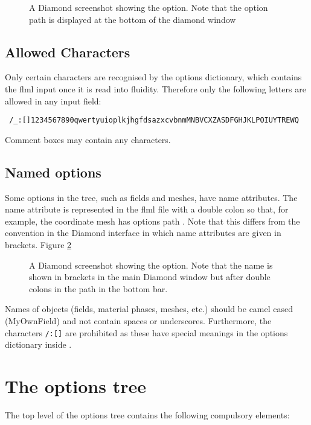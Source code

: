 \begin{figure}[ht]
  \centering
  \caption{A Diamond screenshot showing the 
    option. Note that the option path is displayed at the bottom of the
    diamond window}
  \label{fig:geometry_dimension}
\end{figure}

\subsection{Allowed Characters}
Only certain characters are recognised by the options dictionary, which contains the flml input once it is read into fluidity. Therefore only the following letters are allowed in any input field:

\begin{verbatim}
 /_:[]1234567890qwertyuioplkjhgfdsazxcvbnmMNBVCXZASDFGHJKLPOIUYTREWQ
\end{verbatim}

Comment boxes may contain any characters. 

\subsection{Named options}
Some options in the tree, such as fields and meshes, have name
attributes. The name attribute is represented in the flml file with a double colon so that,
for example, the coordinate mesh has options path\onlypdf\linebreak
{}. Note that this differs from the
convention in the Diamond interface in which name attributes are given in brackets. Figure
\ref{fig:mesh_name}

\begin{figure}[ht]
  \centering
  \caption{A Diamond screenshot showing the 
    option. Note that the name is shown in brackets in the main Diamond
    window but after double colons in the path in the bottom bar.}
  \label{fig:mesh_name}
\end{figure}

Names of objects (fields, material phases, meshes, etc.) should be camel cased (MyOwnField) and not contain spaces or underscores. Furthermore, the characters \verb+/:[]+ are prohibited as these have special meanings in the options dictionary inside \fluidity. 

\section{The options tree}\label{Sect:OptionsTree}
The top level of the options tree contains the following compulsory elements:

